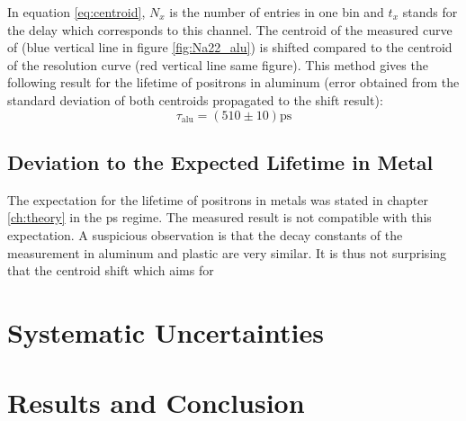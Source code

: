 \documentclass[
	paper=A4,
	parskip=full,
	chapterprefix=true,
	11pt,
	headings=normal,
	bibliography=totoc,
	listof=totoc,
	titlepage=on,
]{scrreprt}
\begin{document}
In equation \ref{eq:centroid}, $N_x$ is the number of entries in one bin and $t_x$ stands for the delay which corresponds to this channel. The centroid of the measured curve of  (blue vertical line in figure \ref{fig:Na22_alu}) is shifted compared to the centroid of the resolution curve (red vertical line same figure). This method gives the following result for the lifetime of positrons in aluminum (error obtained from the standard deviation of both centroids propagated to the shift result):
\begin{equation}
	\tau_\textrm{alu}= \left( 510 \pm 10 \right) \si{\pico\second}
\end{equation}

\section{Deviation to the Expected Lifetime in Metal}

The expectation for the lifetime of positrons in metals was stated in chapter \ref{ch:theory} in the \si{\pico\second} regime. The measured result is not compatible with this expectation. A suspicious observation is that the decay constants of the measurement in aluminum and plastic are very similar. It is thus not surprising that the centroid shift which aims for 



\chapter{Systematic Uncertainties}

\chapter{Results and Conclusion}


\cleardoublepage


{}
\end{document}
